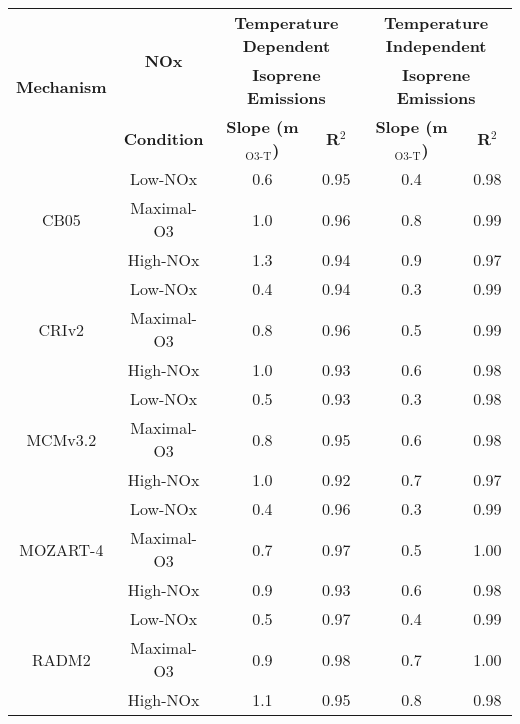 {\renewcommand{\arraystretch}{1.2}
\begin{tabular}{c|c|c|c|c|c}
	\hline\hline
	\multirow{3}{*}{\textbf{Mechanism}} & \multirow{2}{*}{\textbf{NOx}} & \multicolumn{2}{c|}{\textbf{Temperature Dependent}} & \multicolumn{2}{c}{\textbf{Temperature Independent}} \\ 
	 & & \multicolumn{2}{c|}{\textbf{Isoprene Emissions}} &  \multicolumn{2}{c}{\textbf{Isoprene Emissions}} \\ \cline{3-6} 
	 & \textbf{Condition} & \textbf{Slope (m$_{\text{O3-T}}$)} & \textbf{R$^2$} & \textbf{Slope (m$_{\text{O3-T}}$)} & \textbf{R$^2$} \\ 
	\hline\hline
	\multirow{3}{*}{CB05} & Low-NOx & 0.6 & 0.95 & 0.4 & 0.98 \\ 
	 & Maximal-O3 & 1.0 & 0.96 & 0.8 & 0.99 \\ 
	 & High-NOx & 1.3 & 0.94 & 0.9 & 0.97 \\ 
	\hline
	\multirow{3}{*}{CRIv2} & Low-NOx & 0.4 & 0.94 & 0.3 & 0.99 \\ 
	 & Maximal-O3 & 0.8 & 0.96 & 0.5 & 0.99 \\ 
	 & High-NOx & 1.0 & 0.93 & 0.6 & 0.98 \\ 
	\hline
	\multirow{3}{*}{MCMv3.2} & Low-NOx & 0.5 & 0.93 & 0.3 & 0.98 \\ 
	 & Maximal-O3 & 0.8 & 0.95 & 0.6 & 0.98 \\ 
	 & High-NOx & 1.0 & 0.92 & 0.7 & 0.97 \\ 
	\hline
	\multirow{3}{*}{MOZART-4} & Low-NOx & 0.4 & 0.96 & 0.3 & 0.99 \\ 
	 & Maximal-O3 & 0.7 & 0.97 & 0.5 & 1.00 \\ 
	 & High-NOx & 0.9 & 0.93 & 0.6 & 0.98 \\ 
	\hline
	\multirow{3}{*}{RADM2} & Low-NOx & 0.5 & 0.97 & 0.4 & 0.99 \\ 
	 & Maximal-O3 & 0.9 & 0.98 & 0.7 & 1.00 \\ 
	 & High-NOx & 1.1 & 0.95 & 0.8 & 0.98 \\ 
	\hline
	\hline\hline
\end{tabular}}
